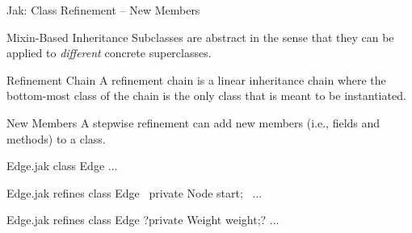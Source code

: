 \begin{frame}[fragile]{Jak: Class Refinement -- New Members} %
	\begin{fancycolumns}[animation=none]
		\begin{definition}{Mixin-Based Inheritance} %
			Subclasses are abstract in the sense that they can be applied to \emph{different} concrete superclasses.
		\end{definition}
		\begin{definition}{Refinement Chain}
			A refinement chain is a linear inheritance chain where the bottom-most class of the chain is the only class that is meant to be instantiated.
		\end{definition}
		\begin{definition}{New Members}
			A stepwise refinement can add new members (i.e., fields and methods) to a class.
		\end{definition}
	\nextcolumn
\begin{codetight}{Edge.jak}
class Edge {
	...
}
\end{codetight}
\begin{codetight}{Edge.jak}
refines class Edge {
	~private Node start;~
	...
}
\end{codetight}
\begin{codetight}{Edge.jak}
refines class Edge {
	?private Weight weight;?
	...
}
\end{codetight}
	\end{fancycolumns}
\end{frame}

